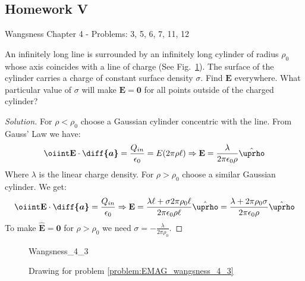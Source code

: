 \documentclass[crop=false,class=article,oneside]{standalone}
\begin{document}
    \subsection{Homework V}
        Wangsness Chapter 4 - Problems: 3, 5, 6, 7, 11, 12
        \begin{problem}[Wangsness 4-3]
            \label{problem:EMAG_wangsness_4_3}
            An infinitely long line is surrounded by an infinitely
            long cylinder of radius $\rho_{0}$ whose axis coincides
            with a line of charge
            (See Fig.~\ref{fig:EMAG_1_Wangsness_4_3}). The surface
            of the  cylinder carries a charge of constant surface
            density $\sigma$. Find $\mathbf{E}$ everywhere. What
            particular value of $\sigma$ will make
            $\mathbf{E}=\mathbf{0}$
            for all points outside of the charged cylinder?
        \end{problem}
        \begin{proof}[Solution]
            For $\rho<\rho_0$ choose a Gaussian cylinder concentric
            with the line. From Gauss' Law we have:
            \begin{equation*}
                \oiint\mathbf{E}\cdot\boldsymbol{\diff{a}}
                =\frac{Q_{in}}{\epsilon_0}
                =E(2\pi\rho\ell)\Rightarrow
                \mathbf{E}
                =\frac{\lambda}{2\pi\epsilon_{0}\rho}
                \hat{\boldsymbol{\uprho}}
            \end{equation*}
            Where $\lambda$ is the linear charge density.
            For $\rho>\rho_{0}$ choose a similar
            Gaussian cylinder. We get:
            \begin{equation*}
                \oiint\mathbf{E}\cdot\boldsymbol{\diff{a}}
                =\frac{Q_{in}}{\epsilon_{0}}
                \Rightarrow\mathbf{E}
                =\frac{\lambda\ell+\sigma 2\pi\rho_{0}\ell}
                {2\pi\epsilon_{0}\rho\ell}\hat{\boldsymbol{\uprho}}
                =\frac{\lambda+2\pi\rho_{0}\sigma}
                      {2\pi\epsilon_{0}\rho}
                \hat{\boldsymbol{\uprho}}
            \end{equation*}
            To make $\hat{\mathbf{E}}=\mathbf{0}$
            for $\rho>\rho_{0}$ we need
            $\sigma=-\frac{\lambda}{2\pi\rho_{0}}$.
        \end{proof}
        \begin{figure}
            \centering
            \captionsetup{type=figure}
            {Wangsness_4_3}
            \caption[Drawing for Wangsness 4-3]
            {Drawing for problem \ref{problem:EMAG_wangsness_4_3}}
            \label{fig:EMAG_1_Wangsness_4_3}
        \end{figure}
\end{document}

